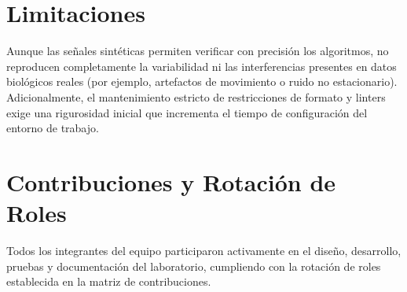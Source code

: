 \documentclass[11pt,a4paper]{article}
\begin{document}
\section{Limitaciones}
Aunque las señales sintéticas permiten verificar con precisión los algoritmos, no reproducen completamente la variabilidad ni las interferencias presentes en datos biológicos reales (por ejemplo, artefactos de movimiento o ruido no estacionario). Adicionalmente, el mantenimiento estricto de restricciones de formato y linters exige una rigurosidad inicial que incrementa el tiempo de configuración del entorno de trabajo.

\section{Contribuciones y Rotación de Roles}
Todos los integrantes del equipo participaron activamente en el diseño, desarrollo, pruebas y documentación del laboratorio, cumpliendo con la rotación de roles establecida en la matriz de contribuciones.
\end{document}
